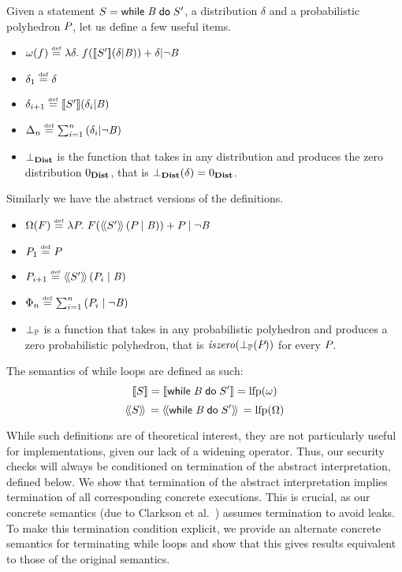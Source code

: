 \begin{definition} Given a statement $ S = \mathsf{while}\;{\mathit{B}}\;\mathsf{do}\;{S'} $, a distribution $ \delta $
and a probabilistic polyhedron $ P_{} $, let us define a few
useful items.

\begin{itemize}
\item{} $ \omega(f) \stackrel{\smash{\scriptscriptstyle \mathrm{def}}}= \lambda \delta . \;
f([\![{S'}]\!]{\left( \delta | \mathit{B}\right)}) + \delta | \neg \mathit{B}
$
\item{} $ \delta_1 \stackrel{\smash{\scriptscriptstyle \mathrm{def}}}= \delta $
\item{} $ \delta_{i+1} \stackrel{\smash{\scriptscriptstyle \mathrm{def}}}= [\![{S'}]\!]{\left( \delta_i | \mathit{B}\right)} $
\item{}
$ \Delta_n \stackrel{\smash{\scriptscriptstyle \mathrm{def}}}= \sum_{i=1}^{n} \left( \delta_i | \neg \mathit{B} \right)
$
\item{} $ \bot_{\textbf{Dist}} $ is the function that takes in any
distribution and produces the zero distribution $ 0_{\textbf{Dist}} $, that is
$ \bot_{\textbf{Dist}}(\delta) = 0_{\textbf{Dist}} $.
\end{itemize}
Similarly we have the abstract versions of the definitions.
\begin{itemize}
\item{} $ \Omega(F) \stackrel{\smash{\scriptscriptstyle \mathrm{def}}}= \lambda P_{} . \;
F(\langle\!\langle{S'}\rangle\!\rangle\,{\left( P_{} \mid \mathit{B} \right)}) + P_{} \mid \neg \mathit{B}
$
\item{} $ P_{1} \stackrel{\smash{\scriptscriptstyle \mathrm{def}}}= P_{} $
\item{} $ P_{i+1} \stackrel{\smash{\scriptscriptstyle \mathrm{def}}}= \langle\!\langle{S'}\rangle\!\rangle\,{\left( P_{i} \mid \mathit{B} \right)} $
\item{}
$ \Phi_n \stackrel{\smash{\scriptscriptstyle \mathrm{def}}}= \sum_{i=1}^{n} \left( P_{i} \mid \neg \mathit{B} \right) $
\item{} $ \bot_{\mathbb{P}} $ is a function that takes in any
probabilistic polyhedron and produces a zero probabilistic polyhedron, that is
$ \mathit{iszero}(\bot_{\mathbb{P}}(P_{})) $ for every $ P_{} $.
\end{itemize}

\end{definition}

The semantics of while loops are defined as such:
$$ [\![{S}]\!]{} = [\![{\mathsf{while}\;{\mathit{B}}\;\mathsf{do}\;{S'}}]\!]{} = \mathrm{lfp}(\omega) $$
$$ \langle\!\langle{S}\rangle\!\rangle\,{} = \langle\!\langle{\mathsf{while}\;{\mathit{B}}\;\mathsf{do}\;{S'}}\rangle\!\rangle\,{} = \mathrm{lfp}(\Omega) $$

While such definitions are of theoretical interest, they are not
particularly useful for implementations, given our lack of a widening
operator. Thus, our security checks will always be conditioned on
termination of the abstract interpretation, defined below.
We show that  termination of the abstract interpretation implies termination
of all corresponding concrete executions.  This is crucial, as our
concrete semantics (due to Clarkson et
al.~\cite{clarkson09quantifying}) assumes termination to avoid leaks.
To make this termination condition explicit,
we provide an alternate concrete
semantics for terminating while loops and show that this
gives results equivalent to those of the original semantics.

